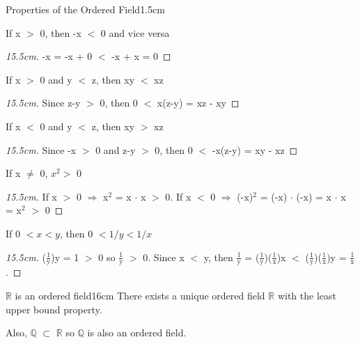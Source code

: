 	\vspace{0.4cm}



	\begin{ltheorem}{Properties of the Ordered Field}{1.5cm}
		\item If x $>$ 0, then -x $<$ 0 and vice versa
	
			\begin{proof}[15.5cm]
				-x = -x + 0 $<$ -x + x = 0
			\end{proof}

		\item If x $>$ 0 and y $<$ z, then xy $<$ xz
	
			\begin{proof}[15.5cm]
				Since z-y $>$ 0, then 0 $<$ x(z-y) = xz - xy
			\end{proof}

		\item If x $ < $ 0 and y $ < $ z, then xy $ > $ xz

			\begin{proof}[15.5cm]
				Since -x $>$ 0 and z-y $>$ 0, then 0 $<$ -x(z-y) = xy - xz
			\end{proof}
	
		\item If x $\neq$ 0, $x^2 > $ 0

			\begin{proof}[15.5cm]
				If x $>$ 0 $\Rightarrow$ x$^\text{2}$ = x $\cdot$ x $>$ 0.
				If x $<$ 0 $\Rightarrow$ (-x)$^\text{2}$ = (-x) $\cdot$ (-x)
				= x $\cdot$ x = x$^\text{2}$ $>$ 0
			\end{proof}
	
		\item If 0 $< x < y$, then 0 $< 1/y < 1/x$

			\begin{proof}[15.5cm]
				($\frac{1}{\text{y}}$)y = 1 $>$ 0 so
				$\frac{1}{\text{y}}$ $>$ 0.				
				Since x $<$ y, then $\frac{1}{\text{y}}$
				= ($\frac{1}{\text{y}}$)($\frac{1}{\text{x}}$)x
				$<$ ($\frac{1}{\text{y}}$)($\frac{1}{\text{x}}$)y
				= $\frac{1}{\text{x}}$.
			\end{proof}
	\end{ltheorem}

	\newpage



	\begin{wtheorem}{$\mathbb{R}$ is an ordered field}{16cm}
		There exists a unique ordered field $\mathbb{R}$ with the
		least upper bound property.

		Also, $\mathbb{Q}$  $\subset$ $\mathbb{R}$ so $\mathbb{Q}$ is
		also an ordered field.
	\end{wtheorem}

